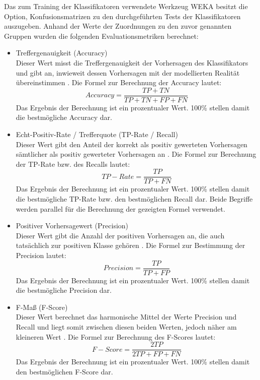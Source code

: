 Das zum Training der Klassifikatoren verwendete Werkzeug WEKA besitzt die Option, Konfusionsmatrizen zu den durchgeführten Tests der Klassifikatoren auszugeben. Anhand der Werte der Zuordnungen zu den zuvor genannten Gruppen wurden die folgenden Evaluationsmetriken berechnet: 

\begin{itemize}
\item Treffergenauigkeit (Accuracy)
\\Dieser Wert misst die Treffergenauigkeit der Vorhersagen des Klassifikators und gibt an, inwieweit dessen Vorhersagen mit der modellierten Realität übereinstimmen \cite{Sammut2017}. Die Formel zur Berechnung der Accuracy lautet:
\\\[Accuracy = \frac{TP+TN}{TP+TN+FP+FN}\]
Das Ergebnis der Berechnung ist ein prozentualer Wert. 100\% stellen damit die bestmögliche Accuracy dar.
\item Echt-Positiv-Rate / Trefferquote (TP-Rate / Recall)
\\Dieser Wert gibt den Anteil der korrekt als positiv gewerteten Vorhersagen sämtlicher als positiv gewerteter Vorhersagen an \cite{Alpaydin2010}. Die Formel zur Berechnung der TP-Rate bzw. des Recalls lautet:
\\\[TP-Rate = \frac{TP}{TP+FN}\]
Das Ergebnis der Berechnung ist ein prozentualer Wert. 100\% stellen damit die bestmögliche TP-Rate bzw. den bestmöglichen Recall dar. Beide Begriffe werden parallel für die Berechnung der gezeigten Formel verwendet.
\item Positiver Vorhersagewert (Precision)
\\ Dieser Wert gibt die Anzahl der positiven Vorhersagen an, die auch tatsächlich zur positiven Klasse gehören \cite{Sammut2017}. Die Formel zur Bestimmung der Precision lautet:
\\\[Precision = \frac{TP}{TP+FP}\]
Das Ergebnis der Berechnung ist ein prozentualer Wert. 100\% stellen damit die bestmögliche Precision dar.
\item F-Maß (F-Score)
\\ Dieser Wert berechnet das harmonische Mittel der Werte Precision und Recall und liegt somit zwischen diesen beiden Werten, jedoch näher am kleineren Wert \cite{Sammut2017}. Die Formel zur Berechnung des F-Scores lautet:
\\\[F-Score = \frac{2TP}{2TP+FP+FN}\]
Das Ergebnis der Berechnung ist ein prozentualer Wert. 100\% stellen damit den bestmöglichen F-Score dar.
\end{itemize}

